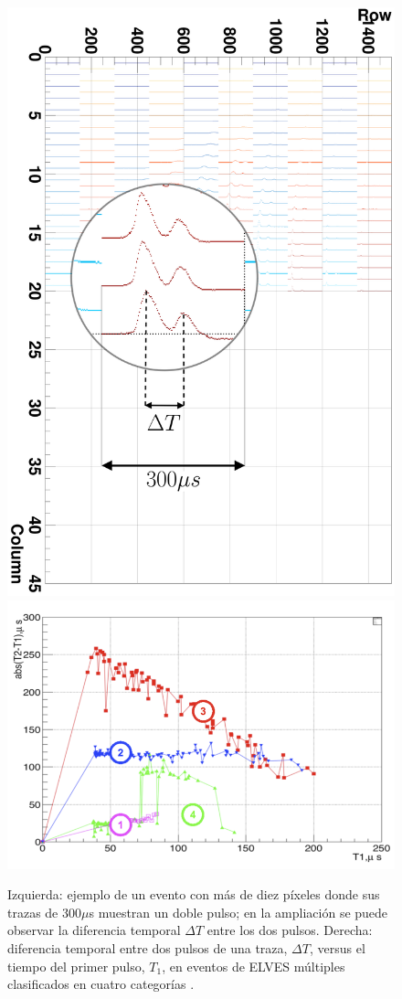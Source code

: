 \documentclass[11pt,oneside,openany,letter]{book}
\begin{document}
\begin{figure}
    \centering
    \includegraphics[scale=0.1]{figures/double_elves_1.png}\includegraphics[scale=0.7]{figures/categorias.png}
    \caption[Clasificaci\'on de los ELVES m\'ultiples]{Izquierda: ejemplo de un evento con m\'as de diez p\'ixeles donde sus trazas de 300$\mu$s muestran un doble pulso; en la ampliaci\'on se puede observar la diferencia temporal $\Delta T$ entre los dos pulsos. Derecha: diferencia temporal entre dos pulsos de una traza, $\Delta T$, versus el tiempo del primer pulso, $T_1$, en eventos de ELVES m\'ultiples clasificados en cuatro categor\'ias \cite{Mussa2019}.}
    \label{fig:categorias}
\end{figure}
\end{document}
